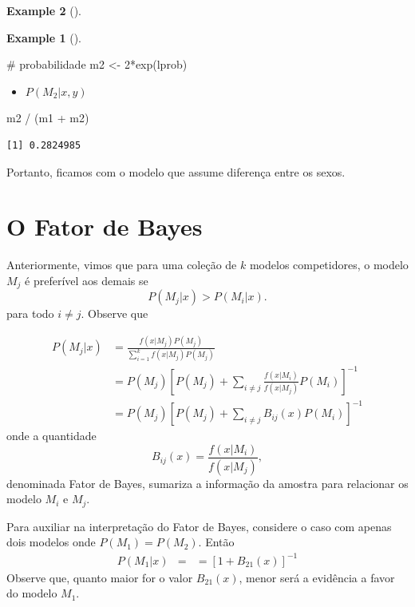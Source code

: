\documentclass[
  letterpaper,
  DIV=11,
  numbers=noendperiod]{scrreprt}
\newenvironment{Shaded}{\begin{snugshade}}{\end{snugshade}}
\newcommand{\CommentTok}[1]{\textcolor[rgb]{0.37,0.37,0.37}{#1}}
\newcommand{\DecValTok}[1]{\textcolor[rgb]{0.68,0.00,0.00}{#1}}
\newcommand{\FunctionTok}[1]{\textcolor[rgb]{0.28,0.35,0.67}{#1}}
\newcommand{\NormalTok}[1]{\textcolor[rgb]{0.00,0.23,0.31}{#1}}
\newcommand{\OtherTok}[1]{\textcolor[rgb]{0.00,0.23,0.31}{#1}}
\newcommand{\SpecialCharTok}[1]{\textcolor[rgb]{0.37,0.37,0.37}{#1}}
\providecommand{\tightlist}{%
  \setlength{\itemsep}{0pt}\setlength{\parskip}{0pt}}\usepackage{longtable,booktabs,array}
\theoremstyle{definition}
\theoremstyle{plain}
\theoremstyle{definition}
\newtheorem{example}{Example}[chapter]
\theoremstyle{remark}
\begin{document}
\begin{example}[]
\begin{example}[]
\begin{Shaded}
\begin{Highlighting}[]
\CommentTok{\# probabilidade}
\NormalTok{m2 }\OtherTok{\textless{}{-}} \DecValTok{2}\SpecialCharTok{*}\FunctionTok{exp}\NormalTok{(lprob)}
\end{Highlighting}
\end{Shaded}

\begin{itemize}
\tightlist
\item
  \(P(M_2|x,y)\)
\end{itemize}

\begin{Shaded}
\begin{Highlighting}[]
\NormalTok{m2 }\SpecialCharTok{/}\NormalTok{ (m1 }\SpecialCharTok{+}\NormalTok{ m2)}
\end{Highlighting}
\end{Shaded}

\begin{verbatim}
[1] 0.2824985
\end{verbatim}

Portanto, ficamos com o modelo que assume diferença entre os sexos.

\end{example}

\section{O Fator de Bayes}\label{o-fator-de-bayes}

Anteriormente, vimos que para uma coleção de \(k\) modelos competidores,
o modelo \(M_j\) é preferível aos demais se \[P(M_j|x)>P(M_i|x).\] para
todo \(i\neq j\). Observe que

\[\begin{align}P(M_j|x)&=\frac{f(x|M_j)P(M_j)}{\sum_{i=1}^kf(x|M_j)P(M_j)}\\&=P(M_j)\left[P(M_j)+\sum_{i\neq j}\frac{f(x|M_i)}{f(x|M_j)}P(M_i)\right]^{-1}\\
&=P(M_j)\left[P(M_j)+\sum_{i\neq j}B_{ij}(x)P(M_i)\right]^{-1}\end{align}\]
onde a quantidade \[B_{ij}(x)=\frac{f(x|M_i)}{f(x|M_j)},\] denominada
Fator de Bayes, sumariza a informação da amostra para relacionar os
modelo \(M_i\) e \(M_j\).

Para auxiliar na interpretação do Fator de Bayes, considere o caso com
apenas dois modelos onde \(P(M_1)=P(M_2)\). Então
\[\begin{align}P(M_1|x)&=
&=\left[1+B_{21}(x)\right]^{-1}\end{align}\] Observe que, quanto maior
for o valor \(B_{21}(x)\), menor será a evidência a favor do modelo
\(M_1\).


\end{example}
\end{document}
